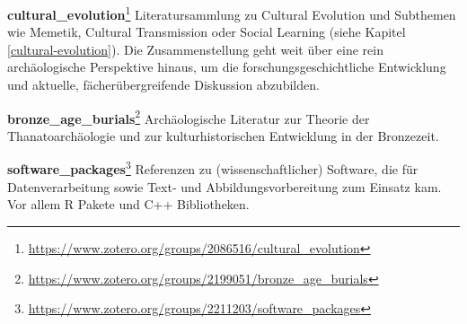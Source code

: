 \documentclass[openany,twoside,twocolumn]{book}
\let\rmarkdownfootnote\footnote%
\def\footnote{\protect\rmarkdownfootnote}
\begin{document}
\textbf{cultural\_evolution}\footnote{\url{https://www.zotero.org/groups/2086516/cultural_evolution}}
\newline  Literatursammlung zu Cultural Evolution und Subthemen wie
Memetik, Cultural Transmission oder Social Learning (siehe Kapitel
\ref{cultural-evolution}). Die Zusammenstellung geht weit über eine rein
archäologische Perspektive hinaus, um die forschungsgeschichtliche
Entwicklung und aktuelle, fächerübergreifende Diskussion abzubilden.

\textbf{bronze\_age\_burials}\footnote{\url{https://www.zotero.org/groups/2199051/bronze_age_burials}}
\newline  Archäologische Literatur zur Theorie der Thanatoarchäologie
und zur kulturhistorischen Entwicklung in der Bronzezeit.

\textbf{software\_packages}\footnote{\url{https://www.zotero.org/groups/2211203/software_packages}}
\newline  Referenzen zu (wissenschaftlicher) Software, die für
Datenverarbeitung sowie Text- und Abbildungsvorbereitung zum Einsatz
kam. Vor allem R Pakete und C++ Bibliotheken.
\end{document}

